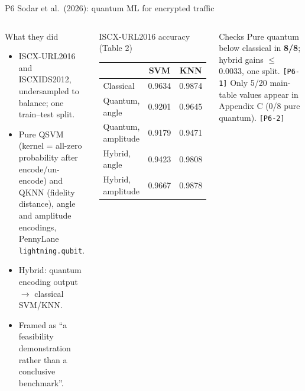 \documentclass[aspectratio=169,10pt,t,xcolor={table}]{beamer}
\begin{document}
\begin{frame}{P6 \quad Sodar et al.\ (2026): quantum ML for encrypted traffic}
\begin{columns}[T]
\begin{block}{What they did}
\footnotesize
\begin{itemize}
  \item ISCX-URL2016 and ISCXIDS2012, undersampled to balance; one train--test split.
  \item Pure QSVM (kernel = all-zero probability after encode/un-encode) and QKNN (fidelity distance), angle and amplitude encodings, PennyLane \texttt{lightning.qubit}.
  \item Hybrid: quantum encoding output $\to$ classical SVM/KNN.
  \item Framed as ``a feasibility demonstration rather than a conclusive benchmark''.
\end{itemize}
\end{block}
\begin{block}{ISCX-URL2016 accuracy (Table 2)}
\scriptsize
\begin{tabular}{lcc}
\toprule
 & SVM & KNN \\
\midrule
Classical & 0.9634 & 0.9874 \\
Quantum, angle & 0.9201 & 0.9645 \\
Quantum, amplitude & 0.9179 & 0.9471 \\
Hybrid, angle & 0.9423 & 0.9808 \\
Hybrid, amplitude & 0.9667 & 0.9878 \\
\bottomrule
\end{tabular}
\end{block}
\begin{alertblock}{Checks}
\footnotesize
Pure quantum below classical in \textbf{8/8}; hybrid gains $\le$ 0.0033, one split. \texttt{[P6-1]} Only 5/20 main-table values appear in Appendix C (0/8 pure quantum). \texttt{[P6-2]}
\end{alertblock}
\end{columns}
\end{frame}
\end{document}
